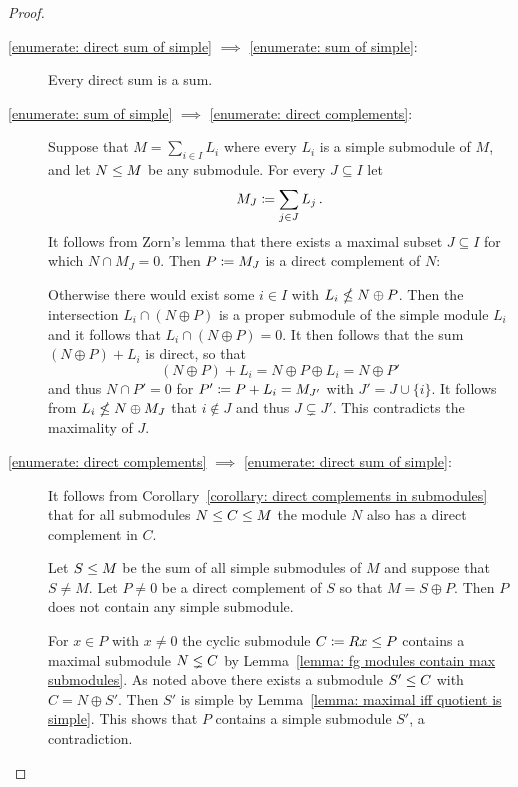 \begin{proof}
  \leavevmode
  \begin{description}
    \item[\ref*{enumerate: direct sum of simple} $\implies$ \ref*{enumerate: sum of simple}:]
      Every direct sum is a sum.
    \item[\ref*{enumerate: sum of simple} $\implies$ \ref*{enumerate: direct complements}:]
      Suppose that $M = \sum_{i \in I} L_i$ where every $L_i$ is a simple submodule of $M$, and let $N \leq M$ be any submodule.
      For every $J \subseteq I$ let
      \[
                  M_J
        \coloneqq  \sum_{j \in J} L_j \,.
      \]
      It follows from Zorn’s lemma that there exists a maximal subset $J \subseteq I$ for which $N \cap M_J = 0$.
      Then $P \coloneqq M_J$ is a direct complement of $N$:
      
      Otherwise there would exist some $i \in I$ with $L_i \nleq N \oplus P$.
      Then the intersection $L_i \cap (N \oplus P)$ is a proper submodule of the simple module $L_i$ and it follows that $L_i \cap (N \oplus P) = 0$.
      It then follows that the sum $(N \oplus P) + L_i$ is direct, so that
      \[
          (N \oplus P) + L_i
        = N \oplus P \oplus L_i
        = N \oplus P'
      \]
      and thus $N \cap P' = 0$ for $P' \coloneqq P + L_i = M_{J'}$ with $J' = J \cup \{i\}$.
      It follows from $L_i \nleq N \oplus M_J$ that $i \notin J$ and thus $J \subsetneq J'$.
      This contradicts the maximality of $J$.
    \item[\ref*{enumerate: direct complements} $\implies$ \ref*{enumerate: direct sum of simple}:]
      It follows from Corollary~\ref{corollary: direct complements in submodules} that for all submodules $N \leq C \leq M$ the module $N$ also has a direct complement in $C$.
      
      Let $S \leq M$ be the sum of all simple submodules of $M$ and suppose that $S \neq M$.
      Let $P \neq 0$ be a direct complement of $S$ so that $M = S \oplus P$.
      Then $P$ does not contain any simple submodule.
      
      For $x \in P$ with $x \neq 0$ the cyclic submodule $C \coloneqq Rx \leq P$ contains a maximal submodule $N \lneq C$ by Lemma~\ref{lemma: fg modules contain max submodules}.
      As noted above there exists a submodule $S' \leq C$ with $C = N \oplus S'$.
      Then $S'$ is simple by Lemma~\ref{lemma: maximal iff quotient is simple}.
      This shows that $P$ contains a simple submodule $S'$, a contradiction.
    \qedhere
  \end{description}
\end{proof}


